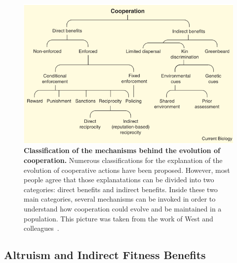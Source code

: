    \begin{figure}[hbt]
        \begin{center}
          \includegraphics[scale = 0.50]{fig/Intro/ClassificationCooperation.png}
          \caption{\textbf{Classification of the mechanisms behind the evolution of cooperation.} Numerous classifications for the explanation of the evolution of cooperative actions have been proposed. However, most people agree that those explanatations can be divided into two categories: direct benefits and indirect benefits. Inside these two main categories, several mechanisms can be invoked in order to understand how cooperation could evolve and be maintained in a population. This picture was taken from the work of West and colleagues~\parencite{West2007}.} 
          \label{fig:ClassificationCooperation}
        \end{center}
    \end{figure}

  \subsection{Altruism and Indirect Fitness Benefits}

